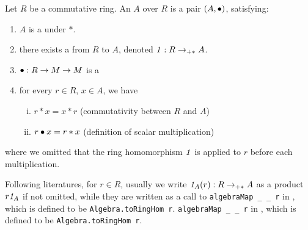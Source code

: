 \begin{definition}[Algebra]
    \label{Algebra}
    \leanok

    Let $R$ be a commutative ring. An  $A$ over $R$ is a pair $(A, \bullet)$, satisfying:

    \begin{enumerate}
    \item $A$ is a  under $*$.
    
    \item there exists a  from $R$ to $A$, denoted $\mathit{1} : R \to_{+*} A$.
    
    \item $\bullet : R \to M \to M$ is a 
    
    \item for every $r \in R$, $x \in A$, we have

    \begin{enumerate}[(i)]
        \item $r * x = x * r$ (commutativity between $R$ and $A$)
        \item $r \bullet x = r * x$ (definition of scalar multiplication)
    \end{enumerate}

    \end{enumerate}

    where we omitted that the ring homomorphism $\mathit{1}$ is applied to $r$ before each multiplication.

\end{definition}

\begin{remark}
    \label{mk:AlgebraNotation}

    Following literatures, for $r \in R$, 
    usually we write $\mathit{1}_A(r) : R \to_{+*} A$ as a product $r \mathit{1}_A$ if not omitted,
    while they are written as a call to
    \ifuselistings
    \lstinline|algebraMap _ _ r| in \Mathlib,
    which is defined to be \lstinline|Algebra.toRingHom r|.
    \else
    \texttt{algebraMap _ _ r} in \Mathlib,
    which is defined to be \texttt{Algebra.toRingHom r}.
    \fi

\end{remark}

